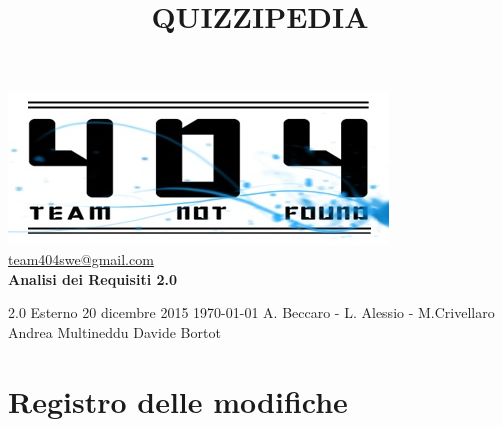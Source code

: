 \documentclass[a4paper,11pt]{article}
\title{\textbf{{\fontsize{8mm}{5mm}\selectfont QUIZZIPEDIA}}}
\date{}
\author{}
\begin{document}
	\maketitle
	\thispagestyle{empty}
	\begin{center}
	\includegraphics{team_not_found.jpg}\\
	\fontsize{5mm}{3mm}\url{team404swe@gmail.com}\\
	
	\vspace{50mm}
	\textbf{Analisi dei Requisiti 2.0}
	\end{center}
	
			{2.0} 							%
			{Esterno} 						%
			{20 dicembre 2015} 				%
			{\today} 						%
			{A. Beccaro - L. Alessio - M.Crivellaro}	%
			{Andrea Multineddu} 				%
			{Davide Bortot} 		%
	\newpage
	\thispagestyle{empty}
	\null
	\newpage
		
	\hspace{30 mm}
	\fancyfoot[R]{\thepage}
	\section*{Registro delle modifiche}
	
\end{document}
